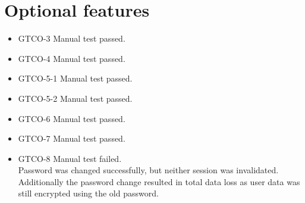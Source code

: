 \section{Optional features}
\begin{itemize}
	\item{GTCO-3} Manual test passed.
	\item{GTCO-4} Manual test passed.
	\item{GTCO-5-1} Manual test passed.
	\item{GTCO-5-2} Manual test passed.
	\item{GTCO-6} Manual test passed.
	\item{GTCO-7} Manual test passed.
	\item{GTCO-8} Manual test failed. \\ Password was changed successfully, but neither session was invalidated. \\ Additionally the password change resulted in total data loss as user data was still encrypted using the old password.
\end{itemize}